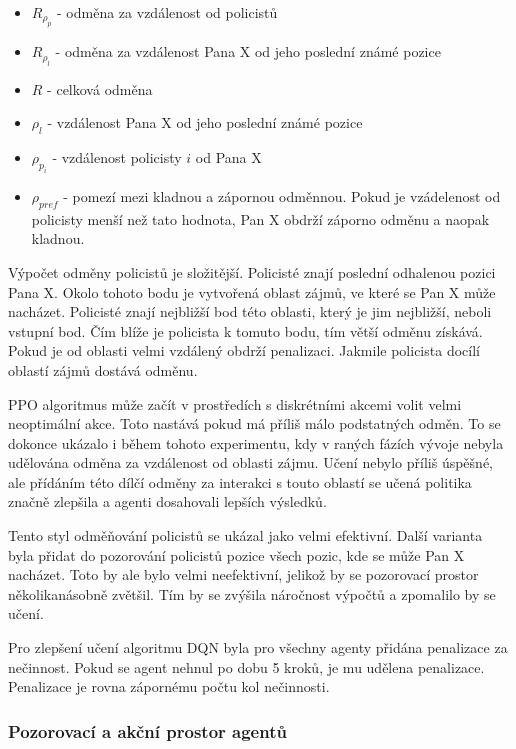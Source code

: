 \begin{itemize}
  \item $R_{\rho_p}$ - odměna za vzdálenost od policistů
  \item $R_{\rho_l}$ - odměna za vzdálenost Pana X od jeho poslední známé pozice
  \item $R$ - celková odměna
  \item $\rho_l$ - vzdálenost Pana X od jeho poslední známé pozice
  \item $\rho_{p_i}$ - vzdálenost policisty $i$ od Pana X
  \item $\rho_{pref}$ - pomezí mezi kladnou a zápornou odměnnou.
  Pokud je vzádelenost od policisty menší než tato hodnota, Pan X obdrží záporno odměnu a naopak kladnou.
\end{itemize}

Výpočet odměny policistů je složitější.
Policisté znají poslední odhalenou pozici Pana X\@.
Okolo tohoto bodu je vytvořená oblast zájmů, ve které se Pan X může nacházet.
Policisté znají nejbližší bod této oblasti, který je jim nejbližší, neboli vstupní bod.
Čím blíže je policista k tomuto bodu, tím větší odměnu získává.
Pokud je od oblasti velmi vzdálený obdrží penalizaci.
Jakmile policista docílí oblastí zájmů dostává odměnu.

PPO algoritmus může začít v prostředích s diskrétními akcemi volit velmi neoptimální akce.
Toto nastává pokud má příliš málo podstatných odměn\cite{PPO_weakness}.
To se dokonce ukázalo i během tohoto experimentu, kdy v raných fázích vývoje nebyla udělována odměna za vzdálenost od oblasti zájmu.
Učení nebylo příliš úspěšné, ale přídáním této dílčí odměny za interakci s touto oblastí se učená politika značně zlepšila a agenti dosahovali lepších výsledků.

Tento styl odměňování policistů se ukázal jako velmi efektivní.
Další varianta byla přidat do pozorování policistů pozice všech pozic, kde se může Pan X nacházet.
Toto by ale bylo velmi neefektivní, jelikož by se pozorovací prostor několikanásobně zvětšil.
Tím by se zvýšila náročnost výpočtů a zpomalilo by se učení.

\bigskip

Pro zlepšení učení algoritmu DQN byla pro všechny agenty přidána penalizace za nečinnost.
Pokud se agent nehnul po dobu 5 kroků, je mu udělena penalizace.
Penalizace je rovna zápornému počtu kol nečinnosti.

\subsubsection*{Pozorovací a akční prostor agentů}

